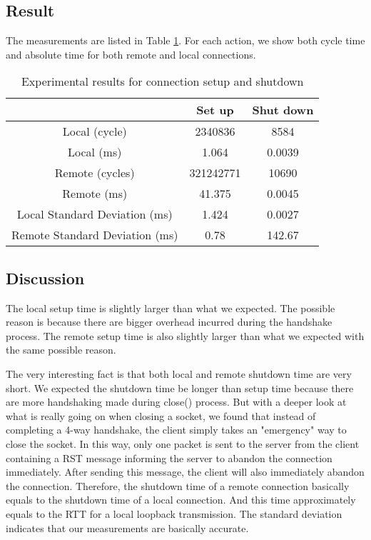 \subsection{Result}

The measurements are listed in Table \ref{setupshutdown}. For each action, we show both cycle time and absolute time for both remote and local connections. 

\begin{table}[htbp]
\centering
\begin{tabular}{|c|c|c|}
\hline
& Set up & Shut down \\ \hline
Local (cycle) & 2340836 & 8584 \\ \hline
Local (ms) & 1.064 & 0.0039 \\ \hline
Remote (cycles) & 321242771 & 10690 \\ \hline
Remote (ms) & 41.375 &  0.0045 \\ \hline
Local Standard Deviation (ms) & 1.424 & 0.0027\\ \hline
Remote Standard Deviation (ms) & 0.78 & 142.67 \\ \hline
\end{tabular}
\caption{Experimental results for connection setup and shutdown}
\label{setupshutdown}
\end{table}

\subsection{Discussion}

The local setup time is slightly larger than what we expected. The possible reason is because there are bigger overhead incurred during the handshake process. The remote setup time is also slightly larger than what we expected with the same possible reason. 

The very interesting fact is that both local and remote shutdown time are very short. We expected the shutdown time be longer than setup time because there are more handshaking made during close() process. But with a deeper look at what is really going on when closing a socket, we found that instead of completing a 4-way handshake, the client simply takes an "emergency" way to close the socket. In this way, only one packet is sent to the server from the client containing a RST message informing the server to abandon the connection immediately. After sending this message, the client will also immediately abandon the connection. Therefore, the shutdown time of a remote connection basically equals to the shutdown time of a local connection. And this time approximately equals to the RTT for a local loopback transmission. The standard deviation indicates that our measurements are basically accurate. 


